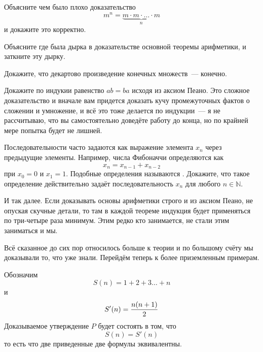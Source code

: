 \begin{exercise}
Объясните чем было плохо доказательство
$$m^n = \underbrace{m\cdot m \cdot \ldots \cdot m}_n$$
и докажите это корректно.
\end{exercise}

\begin{exercise}
Объясните где была дырка в доказательстве основной теоремы арифметики, и заткните эту дырку.
\end{exercise}

\begin{exercise}
Докажите, что декартово произведение конечных множеств~--- конечно.
\end{exercise}

\begin{exercise}
Докажите по индукии равенство $ab=ba$ исходя из аксиом Пеано. Это сложное доказательство и вначале вам придется доказать кучу промежуточных фактов о сложении и умножение, и всё это тоже делается по индукции~--- я не рассчитываю, что вы самостоятельно доведёте работу до конца, но по крайней мере попытка будет не лишней.
\end{exercise}

\begin{exercise}
Последовательности часто задаются как выражение элемента $x_n$ через предыдущие элементы. Например, числа Фибоначчи определяются как
$$x_n = x_{n-1} + x_{n-2}$$
при $x_0 = 0$ и $x_1 = 1$. Подобные определения называются . Докажите, что такое определение действительно задаёт последовательность $x_n$ для любого $n\in\mathbb{N}$.
\end{exercise}

И так далее. Если доказывать основы арифметики строго и из аксиом Пеано, не опуская скучные детали, то там в каждой теореме индукция будет применяться по три-четыре раза минимум. Этим редко кто занимается, не стали этим заниматься и мы.

Всё сказанное до сих пор относилось больше к теории и по большому счёту мы доказывали то, что уже знали. Перейдём теперь к более приземленным примерам.

\begin{example}Обозначим
$$S(n) = 1 + 2 +3 \ldots + n$$
и
$$S'(n) = {n(n+1)\over 2}$$
Доказываемое утверждение $P$ будет состоять в том, что
$$S(n) = S'(n)$$
то есть что две приведенные две формулы эквивалентны.
\end{example}

